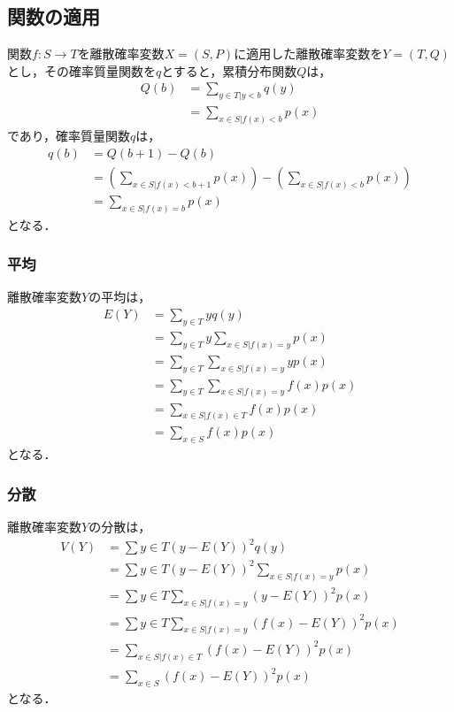 \documentclass[dvipdfmx]{jsarticle}
\begin{document}
 \subsection{関数の適用}
関数$f:S\to T$を離散確率変数$X=\left(S,P\right)$に適用した離散確率変数を$Y=\left(T,Q\right)$とし，その確率質量関数を$q$とすると，累積分布関数$Q$は，
 \begin{align}
Q\left(b\right)&=\sum_{y\in T|y<b}q\left(y\right)\nonumber\\
&=\sum_{x\in S|f\left(x\right)<b}p\left(x\right)
 \end{align}
であり，確率質量関数$q$は，
 \begin{align}
q\left(b\right)&=Q\left(b+1\right)-Q\left(b\right)\nonumber\\
&=\left(\sum_{x\in S|f\left(x\right)<b+1}p\left(x\right)\right)-\left(\sum_{x\in S|f\left(x\right)<b}p\left(x\right)\right)\nonumber\\
&=\sum_{x\in S|f\left(x\right)=b}p\left(x\right)
 \end{align}
となる．
 \subsubsection{平均}
離散確率変数$Y$の平均は，
 \begin{align}
E\left(Y\right)&=\sum_{y\in T}yq\left(y\right)\nonumber\\
&=\sum_{y\in T}y\sum_{x\in S|f\left(x\right)=y}p\left(x\right)\nonumber\\
&=\sum_{y\in T}\sum_{x\in S|f\left(x\right)=y}yp\left(x\right)\nonumber\\
&=\sum_{y\in T}\sum_{x\in S|f\left(x\right)=y}f\left(x\right)p\left(x\right)\nonumber\\
&=\sum_{x\in S|f\left(x\right)\in T}f\left(x\right)p\left(x\right)\nonumber\\
&=\sum_{x\in S}f\left(x\right)p\left(x\right)
 \end{align}
となる．
 \subsubsection{分散}
離散確率変数$Y$の分散は，
 \begin{align}
V\left(Y\right)&=\sum{y\in T}\left(y-E\left(Y\right)\right)^2q\left(y\right)\nonumber\\
&=\sum{y\in T}\left(y-E\left(Y\right)\right)^2\sum_{x\in S|f\left(x\right)=y}p\left(x\right)\nonumber\\
&=\sum{y\in T}\sum_{x\in S|f\left(x\right)=y}\left(y-E\left(Y\right)\right)^2p\left(x\right)\nonumber\\
&=\sum{y\in T}\sum_{x\in S|f\left(x\right)=y}\left(f\left(x\right)-E\left(Y\right)\right)^2p\left(x\right)\nonumber\\
&=\sum_{x\in S|f\left(x\right)\in T}\left(f\left(x\right)-E\left(Y\right)\right)^2p\left(x\right)\nonumber\\
&=\sum_{x\in S}\left(f\left(x\right)-E\left(Y\right)\right)^2p\left(x\right)
 \end{align}
となる．
\end{document}
